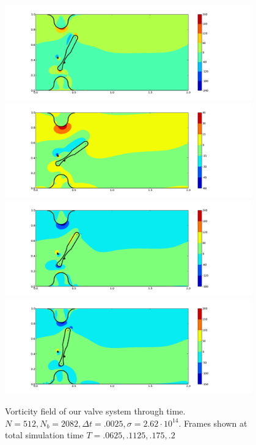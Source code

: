 \documentclass[preprint,12pt]{elsarticle}
\begin{document}
\begin{figure}[p]
\begin{center}
\includegraphics[bb=1.3in .5in 13.5in 6in,width=4.2in,clip]{fig_c25_n512.pdf}
\hfill
\includegraphics[bb=1.3in .5in 13.5in 6in,width=4.2in,clip]{fig_c45_n512.pdf}
\hfill
\includegraphics[bb=1.3in .5in 13.5in 6.3in,width=4.2in,clip]{fig_c70_n512.pdf}
\hfill
\includegraphics[bb=1.3in .5in 13.5in 6.5in,width=4.2in,clip]{fig_c80_n512.pdf}
\end{center}
\caption{\small Vorticity field of our valve system through time. $N=512,N_b=2082,\Delta t=.0025,\sigma=2.62\cdot 10^{14}$. Frames shown at total simulation time $T=.0625,.1125,.175,.2$}
\label{fig:TimeProgression}
\end{figure}
\end{document}
